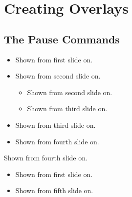          \section{Creating Overlays}
         \subsection{The Pause Commands}
         \begin{frame}
         \begin{itemize}
         \item
         Shown from first slide on.
         \pause
         \item
         Shown from second slide on.
         \begin{itemize}
         \item
         Shown from second slide on.
         \pause
         \item
         Shown from third slide on.
         \end{itemize}
         \item
         Shown from third slide on.
         \pause
         \item
         Shown from fourth slide on.
         \end{itemize}
         Shown from fourth slide on.
         \begin{itemize}
         \onslide
         \item
         Shown from first slide on.
         \pause
         \item
         Shown from fifth slide on.
         \end{itemize}
         \end{frame}
